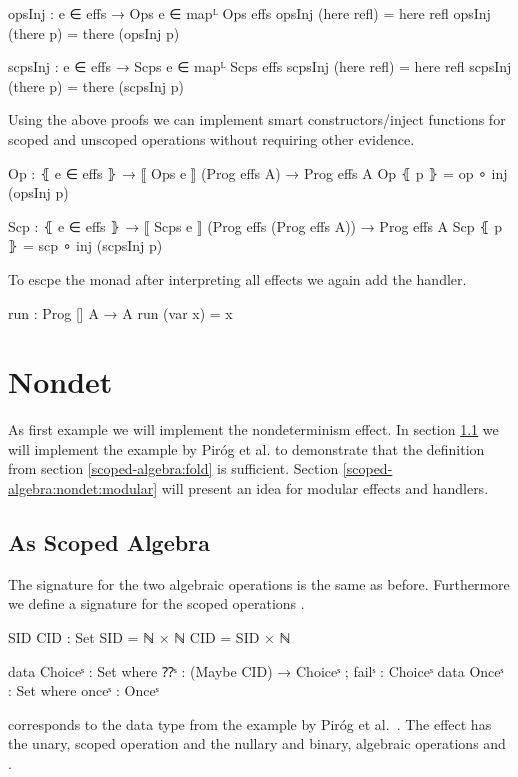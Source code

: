 \begin{code}
opsInj : e ∈ effs → Ops e ∈ mapᴸ Ops effs
opsInj (here refl) = here refl
opsInj (there p)   = there (opsInj p)

scpsInj : e ∈ effs → Scps e ∈ mapᴸ Scps effs
scpsInj (here refl) = here refl
scpsInj (there p)   = there (scpsInj p)
\end{code}
Using the above proofs we can implement smart constructors/inject functions for
scoped and unscoped operations without requiring other evidence.

\begin{code}
Op : ⦃ e ∈ effs ⦄ → ⟦ Ops e ⟧ (Prog effs A) → Prog effs A
Op ⦃ p ⦄ = op ∘ inj (opsInj p)

Scp : ⦃ e ∈ effs ⦄ → ⟦ Scps e ⟧ (Prog effs (Prog effs A)) → Prog effs A
Scp ⦃ p ⦄ = scp ∘ inj (scpsInj p)
\end{code}

To escpe the monad after interpreting all effects we again add the
 handler.

\begin{code}
run : Prog [] A → A
run (var x) = x
\end{code}

\section{Nondet}

As first example we will implement the nondeterminism effect.
In section \ref{scoped-algebra:nondet:scoped-algebra} we will implement the
example by Piróg et al. to demonstrate that the  definition
from section \ref{scoped-algebra:fold} is sufficient.
Section \ref{scoped-algebra:nondet:modular} will present an idea for modular
effects and handlers.

\subsection{As Scoped Algebra}
\label{scoped-algebra:nondet:scoped-algebra}
The signature for the two algebraic operations is the same as before.
Furthermore we define a signature for the scoped operations .

\begin{code}[hide]
SID CID : Set
SID = ℕ × ℕ
CID = SID × ℕ
\end{code}
\begin{code}
data Choiceˢ  : Set where ⁇ˢ : (Maybe CID) → Choiceˢ ; failˢ : Choiceˢ
data Onceˢ    : Set where onceˢ : Onceˢ
\end{code}
 corresponds to the data type from the example by Piróg et
al.~\cite[sec.~6]{DBLP:conf/lics/PirogSWJ18}.
The effect has the unary, scoped operation  and the nullary
and binary, algebraic operations  and .

